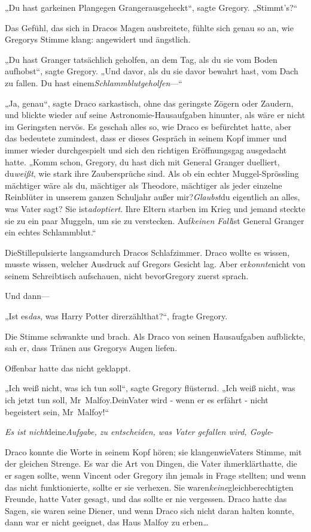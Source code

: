 {„Du hast garkeinen Plangegen Grangerausgeheckt“, sagte Gregory. „Stimmt's?“

Das Gefühl, das sich in Dracos Magen ausbreitete, fühlte sich genau so an, wie Gregorys Stimme klang: angewidert und ängstlich.

„Du hast Granger tatsächlich geholfen, an dem Tag, als du sie vom Boden aufhobst“, sagte Gregory. „Und davor, als du sie davor bewahrt hast, vom Dach zu fallen. Du hast einem\emph{Schlammblutgeholfen}—“

„Ja, genau“, sagte Draco sarkastisch, ohne das geringste Zögern oder Zaudern, und blickte wieder auf seine Astronomie-Hausaufgaben hinunter, als wäre er nicht im Geringsten nervös. Es geschah alles so, wie Draco es befürchtet hatte, aber das bedeutete zumindest, dass er dieses Gespräch in seinem Kopf immer und immer wieder durchgespielt und sich den richtigen Eröffnungsgag ausgedacht hatte. „Komm schon, Gregory, du hast dich mit General Granger duelliert, du\emph{weißt}, wie stark ihre Zaubersprüche sind. Als ob ein echter Muggel-Sprössling mächtiger wäre als du, mächtiger als Theodore, mächtiger als jeder einzelne Reinblüter in unserem ganzen Schuljahr außer mir?\emph{Glaubst}du eigentlich an alles, was Vater sagt? Sie ist\emph{adoptiert}. Ihre Eltern starben im Krieg und jemand steckte sie zu ein paar Muggeln, um sie zu verstecken. Auf\emph{keinen Fall}ist General Granger ein echtes Schlammblut.“

DieStillepulsierte langsamdurch Dracos Schlafzimmer. Draco wollte es wissen, musste wissen, welcher Ausdruck auf Gregors Gesicht lag. Aber er\emph{konnte}nicht von seinem Schreibtisch aufschauen, nicht bevorGregory zuerst sprach.

Und dann—

„Ist es\emph{das}, was Harry Potter direrzählthat?“, fragte Gregory.

Die Stimme schwankte und brach. Als Draco von seinen Hausaufgaben aufblickte, sah er, dass Tränen aus Gregorys Augen liefen.

Offenbar hatte das nicht geklappt.

„Ich weiß nicht, was ich tun soll“, sagte Gregory flüsternd. „Ich weiß nicht, was ich jetzt tun soll, Mr~Malfoy.DeinVater wird - wenn er es erfährt - nicht begeistert sein, Mr~Malfoy!“

\emph{Es ist nicht}deine\emph{Aufgabe, zu entscheiden, was Vater gefallen wird, Goyle}-

Draco konnte die Worte in seinem Kopf hören; sie klangenwieVaters Stimme, mit der gleichen Strenge. Es war die Art von Dingen, die Vater ihmerklärthatte, die er sagen sollte, wenn Vincent oder Gregory ihn jemals in Frage stellten; und wenn das nicht funktionierte, sollte er sie verhexen. Sie waren\emph{keine}gleichberechtigten Freunde, hatte Vater gesagt, und das sollte er nie vergessen. Draco hatte das Sagen, sie waren seine Diener, und wenn Draco sich nicht daran halten konnte, dann war er nicht geeignet, das Haus Malfoy zu erben…

}

